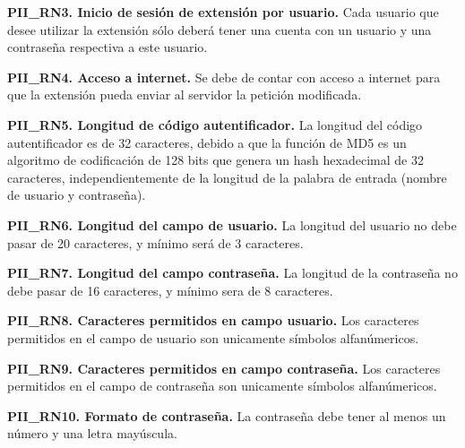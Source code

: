 \documentclass[12pt, a4paper, titlepage]{report}
\begin{document}
            \textbf{PII\_RN3. Inicio de sesión de extensión por usuario.} Cada usuario que desee utilizar la extensión sólo deberá tener una cuenta con un usuario y una contraseña respectiva a este usuario. \\
            \label{PII_RN3}
            
            \textbf{PII\_RN4. Acceso a internet.} Se debe de contar con acceso a internet para que la extensión pueda enviar al servidor la petición modificada.\\
            \label{PII_RN4}
				
			\textbf{PII\_RN5. Longitud de código autentificador.} La longitud del código autentificador es de 32 caracteres, debido a que la función de MD5 es un algoritmo de codificación de 128 bits que genera un hash hexadecimal de 32 caracteres, independientemente de la longitud de la palabra de entrada (nombre de usuario y contraseña).\\
			\label{PII_RN5}
			
			\textbf{PII\_RN6. Longitud del campo de usuario.} La longitud del usuario no debe pasar de 20 caracteres, y mínimo será de 3 caracteres.\\
			\label{PII_RN6}
			
			\textbf{PII\_RN7. Longitud del campo contraseña.}
			La longitud de la contraseña no debe pasar de 16 caracteres, y mínimo sera de 8 caracteres.\\
			\label{PII_RN7}
			
			\textbf{PII\_RN8. Caracteres permitidos en campo usuario.} Los caracteres permitidos en el campo de usuario son unicamente símbolos alfanúmericos.\\
			\label{PII_RN8}
			
			\textbf{PII\_RN9. Caracteres permitidos en campo contraseña.} Los caracteres permitidos en el campo de contraseña son unicamente símbolos alfanúmericos.\\
			\label{PII_RN9}
			
			\textbf{PII\_RN10. Formato de contraseña.} La contraseña debe tener al menos un número y una letra mayúscula.\\
			\label{PII_RN10}
				
	
\end{document}
